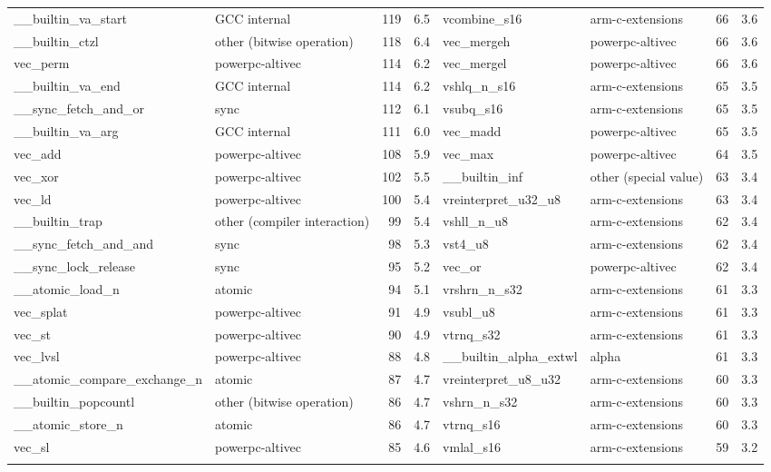 {\begin{table*}
\begin{tabular}{l l r r |l l r r}
\cmidrule(lr){1-8}
\_\_builtin\_va\_start & GCC internal & 119 & 6.5 & vcombine\_s16 & arm-c-extensions & 66 & 3.6\\
\cmidrule(lr){1-8}
\_\_builtin\_ctzl & other (bitwise operation) & 118 & 6.4 & vec\_mergeh & powerpc-altivec & 66 & 3.6\\
\cmidrule(lr){1-8}
vec\_perm & powerpc-altivec & 114 & 6.2 & vec\_mergel & powerpc-altivec & 66 & 3.6\\
\cmidrule(lr){1-8}
\_\_builtin\_va\_end & GCC internal & 114 & 6.2 & vshlq\_n\_s16 & arm-c-extensions & 65 & 3.5\\
\cmidrule(lr){1-8}
\_\_sync\_fetch\_and\_or & sync & 112 & 6.1 & vsubq\_s16 & arm-c-extensions & 65 & 3.5\\
\cmidrule(lr){1-8}
\_\_builtin\_va\_arg & GCC internal & 111 & 6.0 & vec\_madd & powerpc-altivec & 65 & 3.5\\
\cmidrule(lr){1-8}
vec\_add & powerpc-altivec & 108 & 5.9 & vec\_max & powerpc-altivec & 64 & 3.5\\
\cmidrule(lr){1-8}
vec\_xor & powerpc-altivec & 102 & 5.5 & \_\_builtin\_inf & other (special value) & 63 & 3.4\\
\cmidrule(lr){1-8}
vec\_ld & powerpc-altivec & 100 & 5.4 & vreinterpret\_u32\_u8 & arm-c-extensions & 63 & 3.4\\
\cmidrule(lr){1-8}
\_\_builtin\_trap & other (compiler interaction) & 99 & 5.4 & vshll\_n\_u8 & arm-c-extensions & 62 & 3.4\\
\cmidrule(lr){1-8}
\_\_sync\_fetch\_and\_and & sync & 98 & 5.3 & vst4\_u8 & arm-c-extensions & 62 & 3.4\\
\cmidrule(lr){1-8}
\_\_sync\_lock\_release & sync & 95 & 5.2 & vec\_or & powerpc-altivec & 62 & 3.4\\
\cmidrule(lr){1-8}
\_\_atomic\_load\_n & atomic & 94 & 5.1 & vrshrn\_n\_s32 & arm-c-extensions & 61 & 3.3\\
\cmidrule(lr){1-8}
vec\_splat & powerpc-altivec & 91 & 4.9 & vsubl\_u8 & arm-c-extensions & 61 & 3.3\\
\cmidrule(lr){1-8}
vec\_st & powerpc-altivec & 90 & 4.9 & vtrnq\_s32 & arm-c-extensions & 61 & 3.3\\
\cmidrule(lr){1-8}
vec\_lvsl & powerpc-altivec & 88 & 4.8 & \_\_builtin\_alpha\_extwl & alpha & 61 & 3.3\\
\cmidrule(lr){1-8}
\_\_atomic\_compare\_exchange\_n & atomic & 87 & 4.7 & vreinterpret\_u8\_u32 & arm-c-extensions & 60 & 3.3\\
\cmidrule(lr){1-8}
\_\_builtin\_popcountl & other (bitwise operation) & 86 & 4.7 & vshrn\_n\_s32 & arm-c-extensions & 60 & 3.3\\
\cmidrule(lr){1-8}
\_\_atomic\_store\_n & atomic & 86 & 4.7 & vtrnq\_s16 & arm-c-extensions & 60 & 3.3\\
\cmidrule(lr){1-8}
vec\_sl & powerpc-altivec & 85 & 4.6 & vmlal\_s16 & arm-c-extensions & 59 & 3.2\\
\bottomrule{}
\end{tabular}
\label{tbl:common-builtins}
\end{table*}}

